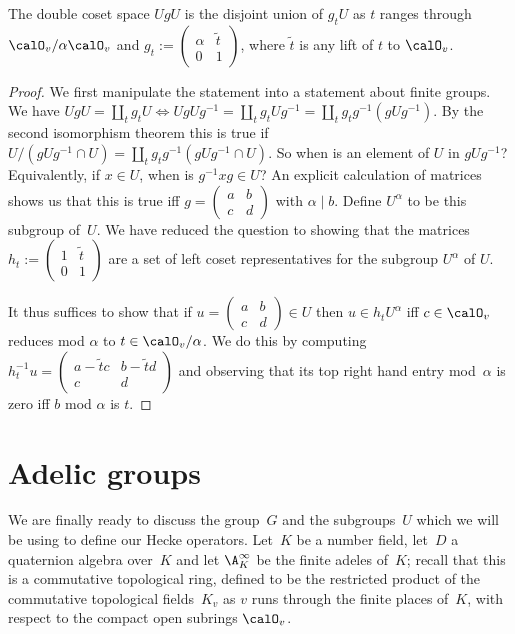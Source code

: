 \begin{lemma} The double coset space $UgU$ is the disjoint union of $g_tU$ as $t$ ranges
  through $\calO_v/\alpha\calO_v$ and $g_t:=\begin{pmatrix}\alpha&\tilde{t}\\0&1\end{pmatrix}$,
  where $\tilde{t}$ is any lift of $t$ to $\calO_v$.
\end{lemma}
\begin{proof} We first manipulate the statement into a statement about finite groups.
  We have $UgU=\coprod_t g_tU\iff UgUg^{-1}=\coprod_t g_tUg^{-1}=\coprod_t g_tg^{-1}(gUg^{-1})$.
  By the second isomorphism theorem this is true if
  $U/(gUg^{-1}\cap U)=\coprod_t g_tg^{-1}(gUg^{-1}\cap U)$. So when is an element of $U$
  in $gUg^{-1}$? Equivalently, if $x\in U$, when is $g^{-1}xg\in U$? An explicit calculation
  of matrices shows us that this is true iff $g=\begin{pmatrix} a&b\\c&d\end{pmatrix}$ with
  $\alpha\mid b$. Define $U^\alpha$ to be this subgroup of~$U$. We have reduced the question
  to showing that the matrices $h_t:=\begin{pmatrix}1&\tilde{t}\\0&1\end{pmatrix}$
  are a set of left coset representatives for the subgroup $U^\alpha$ of $U$.

  It thus suffices to show that if $u=\begin{pmatrix} a&b\\c&d\end{pmatrix}\in U$
  then $u\in h_tU^\alpha$ iff $c\in\calO_v$ reduces mod $\alpha$ to $t\in\calO_v/\alpha$.
  We do this by computing $h_t^{-1}u=\begin{pmatrix} a-\tilde{t}c&b-\tilde{t}d\\c&d\end{pmatrix}$
  and observing that its top right hand entry mod~$\alpha$ is zero iff $b$ mod $\alpha$ is $t$.
\end{proof}

\section{Adelic groups}

We are finally ready to discuss the group~$G$ and the subgroups~$U$ which we will be
using to define our Hecke operators. Let~$K$ be a number field, let~$D$ a quaternion algebra
over~$K$ and let $\A_K^\infty$ be the finite adeles of~$K$; recall that this is a commutative
topological ring, defined to be the restricted
product of the commutative topological fields~$K_v$ as $v$ runs through the finite places
of~$K$, with respect to the compact open subrings $\calO_v$.

